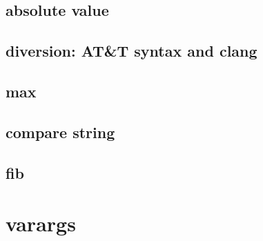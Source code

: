 \subsection{absolute value}

\subsection{diversion: AT\&T syntax and clang}

\subsection{max}

\subsection{compare string}

\subsection{fib}

\section{varargs}

